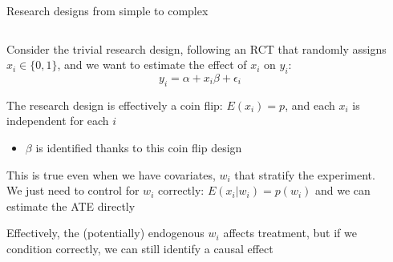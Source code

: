 \documentclass[notes,11pt, aspectratio=169]{beamer}
\newenvironment{wideitemize}{\itemize\addtolength{\itemsep}{10pt}}{\enditemize}
\begin{document}
\begin{frame}{Research designs from simple to complex}
\begin{columns}[T] %
\begin{column}{.75\textwidth}
  \begin{wideitemize}
  \item Consider the trivial research design, following an RCT that
    randomly assigns $x_{i} \in \{0, 1\}$, and we want to estimate the
    effect of $x_{i}$ on $y_{i}$:
    \begin{equation*}
      y_{i} = \alpha + x_{i}\beta + \epsilon_{i}
    \end{equation*}
  \item The research design is effectively a coin flip:
    $E(x_{i}) = p$, and each $x_{i}$ is independent for each $i$
    \begin{itemize}
    \item $\beta$ is identified thanks to this coin flip design
    \end{itemize}
  \item This is true even when we have covariates, $w_{i}$ that stratify the experiment. We just need to control for $w_{i}$ correctly:  $E(x_{i}|w_{i}) = p(w_{i})$ and we can estimate the ATE directly
  \item Effectively, the (potentially) endogenous $w_{i}$ affects
    treatment, but if we condition correctly, we can still identify a
    causal effect
  \end{wideitemize}
\end{column}%
\hfill%
\begin{column}{.25\textwidth}
\end{column}%
\end{columns}
\end{frame}
\end{document}
